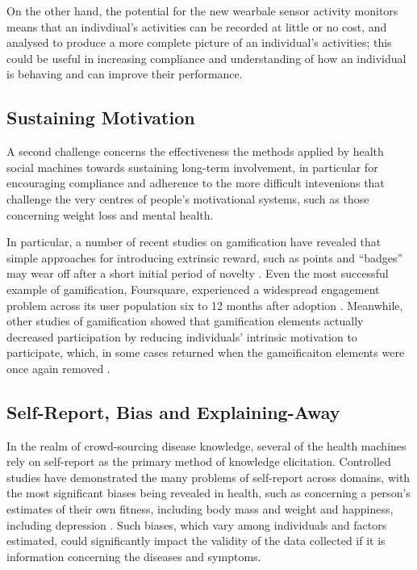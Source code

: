 \documentclass{sig-alternate}
\begin{document}
On the other hand, the potential for the new wearbale sensor activity
monitors means that an indivdiual's activities can be recorded at
little or no cost, and analysed to produce a more complete picture of
an individual's activities; this could be useful in increasing
compliance and understanding of how an individual is behaving and can
improve their performance.

\subsection{Sustaining Motivation}
\label{sec:motivation}
A second challenge concerns the effectiveness the methods applied by
health social machines towards sustaining long-term involvement, in
particular for encouraging compliance and adherence to the more
difficult intevenions that challenge the very centres of people's
motivational systems, such as those concerning weight loss and
mental health.

In particular, a number of recent studies on gamification have
revealed that simple approaches for introducing extrinsic reward, such
as points and ``badges'' may wear off after a short initial period of
novelty \cite{therebedragons}.  Even the most successful example of
gamification, Foursquare, experienced a widespread engagement problem
across its user population six to 12 months after adoption
\cite{browningattheedges}. Meanwhile, other studies of gamification
showed that gamification elements actually decreased participation by
reducing individuals' intrinsic motivation to participate, which, in
some cases returned when the gameificaiton elements were once again
removed \cite{Thom:2012:RGE:2145204.2145362}.

\subsection{Self-Report, Bias and Explaining-Away}

In the realm of crowd-sourcing disease knowledge, several of the
health machines rely on self-report as the primary method of knowledge
elicitation.  Controlled studies have demonstrated the many problems
of self-report across domains, with the most significant biases being
revealed in health, such as concerning a person's estimates of their
own fitness, including body mass and weight \cite{elgar2005validity}
and happiness, including depression \cite{hunt2003self}. Such biases,
which vary among individuals and factors estimated, could
significantly impact the validity of the data collected if it is
information concerning the diseases and symptoms.
\end{document}

